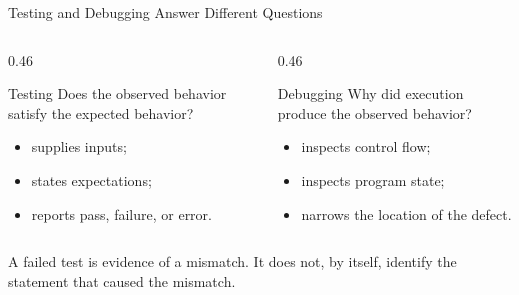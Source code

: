 \documentclass[aspectratio=169,10pt]{beamer}
\begin{document}
\begin{frame}{Testing and Debugging Answer Different Questions}
  \begin{columns}[T,onlytextwidth]
    \begin{column}{0.46\textwidth}
      \begin{block}{Testing}
        Does the observed behavior satisfy the expected behavior?
      \end{block}

      \begin{itemize}
        \item supplies inputs;
        \item states expectations;
        \item reports pass, failure, or error.
      \end{itemize}
    \end{column}

    \begin{column}{0.46\textwidth}
      \begin{block}{Debugging}
        Why did execution produce the observed behavior?
      \end{block}

      \begin{itemize}
        \item inspects control flow;
        \item inspects program state;
        \item narrows the location of the defect.
      \end{itemize}
    \end{column}
  \end{columns}

  \begin{keyidea}
    A failed test is evidence of a mismatch. It does not, by itself, identify the statement that caused the mismatch.
  \end{keyidea}
\end{frame}
\end{document}
